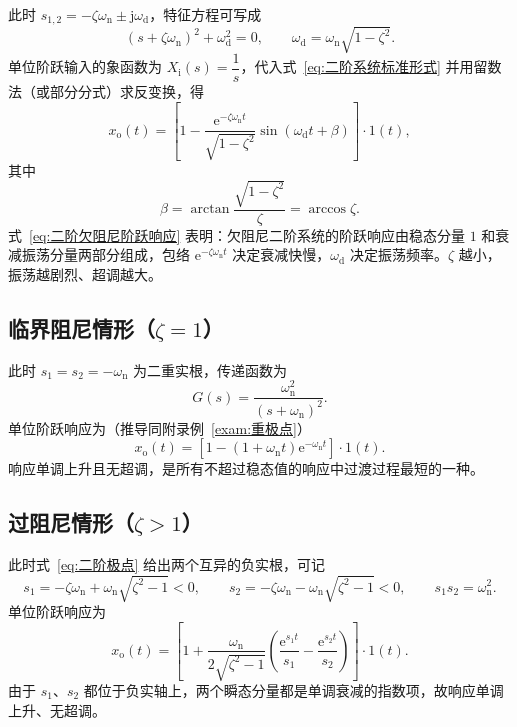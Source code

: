 此时 $s_{1,2}=-\zeta\omega_{\mathrm{n}}\pm\mathrm{j}\omega_{\mathrm{d}}$，特征方程可写成
\[
\left(s+\zeta\omega_{\mathrm{n}}\right)^{2}+\omega_{\mathrm{d}}^{2}=0,
\qquad
\omega_{\mathrm{d}}=\omega_{\mathrm{n}}\sqrt{1-\zeta^{2}}.
\]
单位阶跃输入的象函数为 $X_{\mathrm{i}}(s)=\dfrac{1}{s}$，代入式~\eqref{eq:二阶系统标准形式} 并用留数法（或部分分式）求反变换，得
\begin{equation}
x_{\mathrm{o}}(t)=\left[1-\frac{\mathrm{e}^{-\zeta\omega_{\mathrm{n}}t}}{\sqrt{1-\zeta^{2}}}
\sin\left(\omega_{\mathrm{d}}t+\beta\right)\right]\cdot 1(t),
\label{eq:二阶欠阻尼阶跃响应}
\end{equation}
其中
\begin{equation}
\beta=\arctan\frac{\sqrt{1-\zeta^{2}}}{\zeta}=\arccos\zeta.
\label{eq:beta}
\end{equation}
式~\eqref{eq:二阶欠阻尼阶跃响应} 表明：欠阻尼二阶系统的阶跃响应由稳态分量 $1$ 和衰减振荡分量两部分组成，包络 $\mathrm{e}^{-\zeta\omega_{\mathrm{n}}t}$ 决定衰减快慢，$\omega_{\mathrm{d}}$ 决定振荡频率。$\zeta$ 越小，振荡越剧烈、超调越大。

\subsection{临界阻尼情形（$\zeta=1$）}
\label{sec:二阶临界阻尼}

此时 $s_{1}=s_{2}=-\omega_{\mathrm{n}}$ 为二重实根，传递函数为
\[
G(s)=\frac{\omega_{\mathrm{n}}^{2}}{\left(s+\omega_{\mathrm{n}}\right)^{2}}.
\]
单位阶跃响应为（推导同附录例~\ref{exam:重极点}）
\begin{equation}
x_{\mathrm{o}}(t)=\left[1-\left(1+\omega_{\mathrm{n}}t\right)\mathrm{e}^{-\omega_{\mathrm{n}}t}\right]\cdot 1(t).
\label{eq:二阶临界阻尼阶跃响应}
\end{equation}
响应单调上升且无超调，是所有不超过稳态值的响应中过渡过程最短的一种。

\subsection{过阻尼情形（$\zeta>1$）}
\label{sec:二阶过阻尼}

此时式~\eqref{eq:二阶极点} 给出两个互异的负实根，可记
\[
s_{1}=-\zeta\omega_{\mathrm{n}}+\omega_{\mathrm{n}}\sqrt{\zeta^{2}-1}<0,\qquad
s_{2}=-\zeta\omega_{\mathrm{n}}-\omega_{\mathrm{n}}\sqrt{\zeta^{2}-1}<0,
\qquad s_{1}s_{2}=\omega_{\mathrm{n}}^{2}.
\]
单位阶跃响应为
\begin{equation}
x_{\mathrm{o}}(t)=\left[1+\frac{\omega_{\mathrm{n}}}{2\sqrt{\zeta^{2}-1}}
\left(\frac{\mathrm{e}^{s_{1}t}}{s_{1}}-\frac{\mathrm{e}^{s_{2}t}}{s_{2}}\right)\right]\cdot 1(t).
\label{eq:二阶过阻尼阶跃响应}
\end{equation}
由于 $s_{1}$、$s_{2}$ 都位于负实轴上，两个瞬态分量都是单调衰减的指数项，故响应单调上升、无超调。

